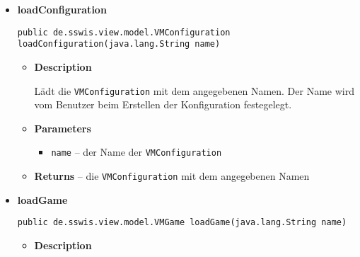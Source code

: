 {{{{{{\begin{itemize}
{\begin{itemize}
{Lädt die \texttt{\small VMCombinedStrategy} mit dem angegebenen Namen. Der Name wird vom Benutzer beim Erstellen der kombinierten Strategie festegelegt.
}
\item{
{\bf  Parameters}
  \begin{itemize}
   \item{
\texttt{name} -- der Name der \texttt{\small VMCombinedStrategy}}
  \end{itemize}
}%
\item{{\bf  Returns} -- 
die \texttt{\small VMCombinedStrategy} mit dem angegebenen Namen 
}%
\end{itemize}
}%
\item{ 
\hypertarget{de.sswis.controller.FileManager.loadConfiguration(java.lang.String)}{{\bf  loadConfiguration}\\}
\begin{lstlisting}[frame=none]
public de.sswis.view.model.VMConfiguration loadConfiguration(java.lang.String name)\end{lstlisting} %
\begin{itemize}
\item{
{\bf  Description}

Lädt die \texttt{\small VMConfiguration} mit dem angegebenen Namen. Der Name wird vom Benutzer beim Erstellen der Konfiguration festegelegt.
}
\item{
{\bf  Parameters}
  \begin{itemize}
   \item{
\texttt{name} -- der Name der \texttt{\small VMConfiguration}}
  \end{itemize}
}%
\item{{\bf  Returns} -- 
die \texttt{\small VMConfiguration} mit dem angegebenen Namen 
}%
\end{itemize}
}%
\item{ 
\hypertarget{de.sswis.controller.FileManager.loadGame(java.lang.String)}{{\bf  loadGame}\\}
\begin{lstlisting}[frame=none]
public de.sswis.view.model.VMGame loadGame(java.lang.String name)\end{lstlisting} %
\begin{itemize}
\item{
{\bf  Description}

}
\end{itemize}}
\end{itemize}}}}}}}
